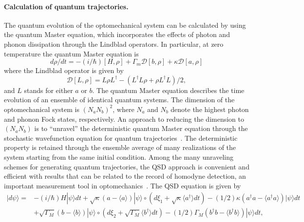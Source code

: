 \documentclass[12pt]{wlscirep}
\begin{document}
\paragraph*{Calculation of quantum trajectories.}
The quantum evolution of the optomechanical system can be calculated by
using the quantum Master equation, which incorporates the effects of 
photon and phonon dissipation through the Lindblad operators. In particular,
at zero temperature the quantum Master equation is~\cite{AKM:2014,LKM:2008}
\begin{equation} \label{eq:master}
d\rho/dt = -(i/\hbar)[H,\rho]+\Gamma_m\mathcal{D}[b,\rho]
+\kappa\mathcal{D}[a,\rho]
\end{equation}
where the Lindblad operator is given by
\begin{equation} \label{eq:Lindblad} 
\mathcal{D}[L,\rho]=L\rho L^\dagger-(L^\dagger L\rho + \rho L^\dagger L)/2,
\end{equation}
and $L$ stands for either $a$ or $b$. The quantum Master equation 
describes the time evolution of an ensemble of identical quantum 
systems. The dimension of the optomechanical system is $(N_aN_b)^2$, 
where $N_a$ and $N_b$ denote the highest photon and phonon Fock states, 
respectively. An approach to reducing the dimension to $(N_aN_b)$ is 
to ``unravel'' the deterministic quantum Master equation through the 
stochastic wavefunction equation for quantum 
trajectories~\cite{GP:1992,GP:1993a,GP:1993b,SB:1997}. The deterministic 
property is retained through the ensemble average of many realizations 
of the system starting from the same initial condition. Among the many
unraveling schemes for generating quantum trajectories, the QSD
approach is convenient and efficient with results that can be related to
the record of homodyne detection, an important measurement tool in 
optomechanics~\cite{WHHRHA:2015}. The QSD equation is
given by~\cite{DGS:1998,SDG:1999}
\begin{equation}
    \label{eq:OMS_QSD}
\begin{split}
|d\psi\rangle =&-(i/\hbar)H|\psi\rangle dt + 
\sqrt{\kappa}(a-\langle a\rangle)
|\psi\rangle\circ(d\xi_1+\sqrt{\kappa}\langle a^\dagger\rangle dt)
-(1/2)\kappa(a^\dagger a-\langle a^\dagger a\rangle)|\psi\rangle
dt \\
&+\sqrt{\Gamma_M}(b-\langle
b\rangle)|\psi\rangle\circ(d\xi_2+\sqrt{\Gamma_M}\langle b^\dagger\rangle dt)
 - (1/2)\Gamma_M(b^\dagger b-\langle b^\dagger b\rangle)|\psi\rangle dt,
\end{split}
\end{equation}
\end{document}
